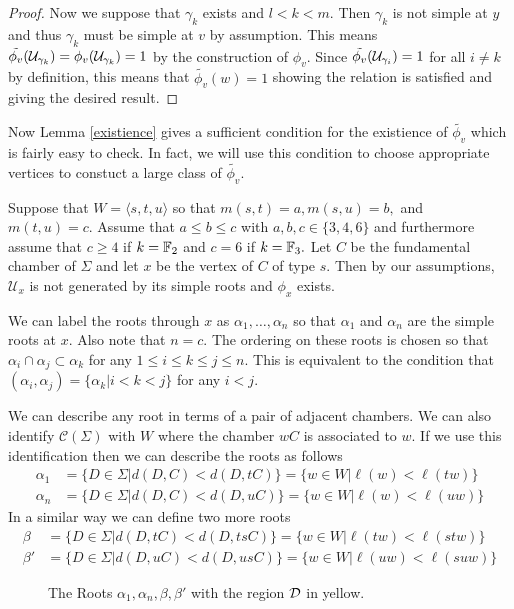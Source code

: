 \documentclass[class=book, crop=false,12 pt]{standalone}
\begin{document}
\begin{proof}
	Now we suppose that $\gamma_k$ exists and $l<k<m.$ Then $\gamma_k$ is not simple at $y$ and thus $\gamma_k$ must be simple at $v$ by assumption. This means $\tilde{\phi_v}(\mathcal{U}_{\gamma_k})=\phi_v(\mathcal{U}_{\gamma_k})=1$ by the construction of $\phi_v.$ Since $\tilde{\phi_v}(\mathcal{U}_{\gamma_i})=1$ for all $i\neq k$ by definition, this means that $\tilde{\phi_v}(w)=1$ showing the relation is satisfied and giving the desired result.
\end{proof}

Now Lemma \ref{existience} gives a sufficient condition for the existience of $\tilde{\phi_v}$ which is fairly easy to check. In fact, we will use this condition to choose appropriate vertices to constuct a large class of $\tilde{\phi_v}.$

Suppose that $W=\langle s,t,u \rangle$ so that $m(s,t)=a,m(s,u)=b,$ and $m(t,u)=c.$ Assume that $a\le b\le c$ with $a,b,c\in \{3,4,6\}$ and furthermore assume that $c\ge 4$ if $k=\mathbb{F}_{2}$ and $c=6$ if $k=\mathbb{F}_{3}.$ Let $C$ be the fundamental chamber of $\Sigma$ and let $x$ be the vertex of $C$ of type $s.$ Then by our assumptions, $\mathcal{U}_x$ is not generated by its simple roots and $\phi_x$ exists.

We can label the roots through $x$ as $\alpha_1,\dots,\alpha_n$ so that $\alpha_1$ and $\alpha_n$ are the simple roots at $x.$ Also note that $n=c.$ The ordering on these roots is chosen so that $\alpha_i\cap \alpha_j\subset \alpha_k$ for any $1\le i \le k \le j\le n.$ This is equivalent to the condition that $(\alpha_i,\alpha_j)=\{\alpha_k|i<k<j\}$ for any $i<j.$

We can describe any root in terms of a pair of adjacent chambers. We can also identify $\mathcal{C}(\Sigma)$ with $W$ where the chamber $wC$ is associated to $w.$ If we use this identification then we can describe the roots as follows
\begin{align*}
	\alpha_1&=\{D\in \Sigma|d(D,C)<d(D,tC)\}=\{w\in W|\ell(w)<\ell(tw)\}\\
	\alpha_n&=\{D\in \Sigma|d(D,C)<d(D,uC)\}=\{w\in W|\ell(w)<\ell(uw)\}
\end{align*}
In a similar way we can define two more roots
\begin{align*}
	\beta&=\{D\in \Sigma|d(D,tC)<d(D,tsC)\}=\{w\in W|\ell(tw)<\ell(stw)\}\\
	\beta'&=\{D\in \Sigma|d(D,uC)<d(D,usC)\}=\{w\in W|\ell(uw)<\ell(suw)\}
\end{align*}
\begin{figure}
	\label{defineD}
	\begin{center}
	\caption{The Roots $\alpha_1,\alpha_n,\beta,\beta'$ with the region $\mathcal{D}$ in yellow.}
\end{center}
\end{figure}
\end{document}
